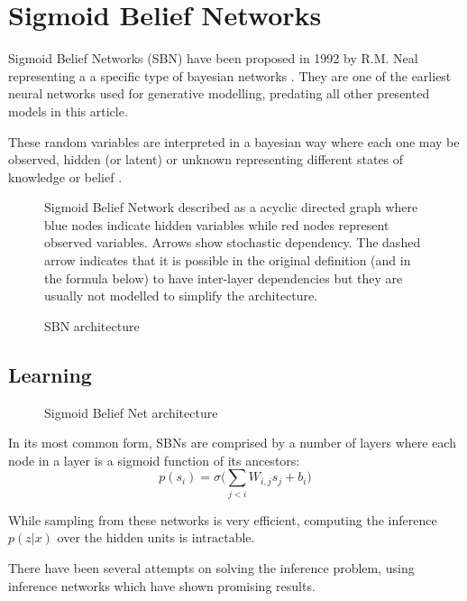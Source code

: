 \section{Sigmoid Belief Networks}
\label{sec:sbn}
Sigmoid Belief Networks (SBN) have been proposed in 1992 by R.M. Neal \cite{neal:1992} representing a a specific type of bayesian networks \cite{pearl:1985}.
They are one of the earliest neural networks used for generative modelling, predating all other presented models in this article.

These random variables are interpreted in a bayesian way where each one may be observed, hidden (or latent) or unknown representing different states of knowledge or belief \cite{definetti:1974}.
\begin{figure}[htb]
\centering

  \caption{SBN architecture}
  \label{fig:sbn_arch}
  \medskip
  \small
  Sigmoid Belief Network described as a acyclic directed graph where blue nodes indicate hidden variables while red nodes represent observed variables.
  Arrows show stochastic dependency. The dashed arrow indicates that it is possible in the original definition (and in the formula below) to have inter-layer dependencies but they are usually not modelled to simplify the architecture.
\end{figure}

\subsection{Learning}
\begin{figure}[htb]
\centering

  \caption{Sigmoid Belief Net  architecture}
  \label{fig:sbn_node}
\end{figure}
In its most common form, SBNs are comprised by a number of layers where each node in a layer is a sigmoid function of its ancestors:
$$
p(s_i) = \sigma\bigg(\sum_{j<i}W_{i,j}s_j+b_i\bigg)
$$

While sampling from these networks is very efficient, computing the inference $p(z|x)$ over the hidden units is intractable.

There have been several attempts on solving the inference problem, using inference networks which have shown promising results.


